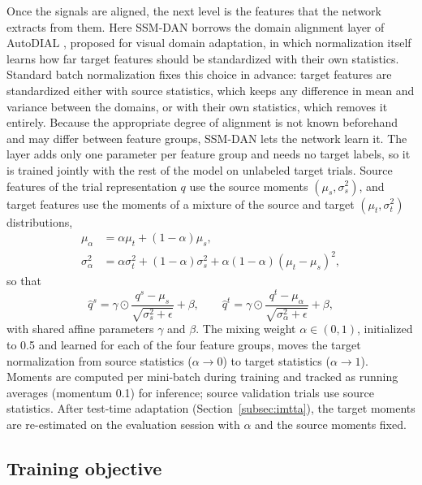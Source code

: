 \documentclass[preprint,12pt]{elsarticle}
\begin{document}
Once the signals are aligned, the next level is the features that the network extracts from them. Here SSM-DAN borrows the domain alignment layer of AutoDIAL \cite{carlucci2017autodial}, proposed for visual domain adaptation, in which normalization itself learns how far target features should be standardized with their own statistics. Standard batch normalization fixes this choice in advance: target features are standardized either with source statistics, which keeps any difference in mean and variance between the domains, or with their own statistics, which removes it entirely. Because the appropriate degree of alignment is not known beforehand and may differ between feature groups, SSM-DAN lets the network learn it. The layer adds only one parameter per feature group and needs no target labels, so it is trained jointly with the rest of the model on unlabeled target trials. Source features of the trial representation $q$ use the source moments $(\mu_s,\sigma_s^2)$, and target features use the moments of a mixture of the source and target $(\mu_t,\sigma_t^2)$ distributions,
\begin{align}
    \mu_\alpha &= \alpha\mu_t+(1-\alpha)\mu_s, \\
    \sigma_\alpha^2 &= \alpha\sigma_t^2+(1-\alpha)\sigma_s^2+\alpha(1-\alpha)(\mu_t-\mu_s)^2,
\end{align}
so that
\begin{equation}
    \hat{q}^s = \gamma\odot\frac{q^s-\mu_s}{\sqrt{\sigma_s^2+\epsilon}}+\beta, \qquad
    \hat{q}^t = \gamma\odot\frac{q^t-\mu_\alpha}{\sqrt{\sigma_\alpha^2+\epsilon}}+\beta ,
\end{equation}
with shared affine parameters $\gamma$ and $\beta$. The mixing weight $\alpha\in(0,1)$, initialized to 0.5 and learned for each of the four feature groups, moves the target normalization from source statistics ($\alpha\rightarrow0$) to target statistics ($\alpha\rightarrow1$). Moments are computed per mini-batch during training and tracked as running averages (momentum 0.1) for inference; source validation trials use source statistics. After test-time adaptation (Section~\ref{subsec:imtta}), the target moments are re-estimated on the evaluation session with $\alpha$ and the source moments fixed.

\subsection{Training objective}
\label{subsec:uda}
\end{document}
